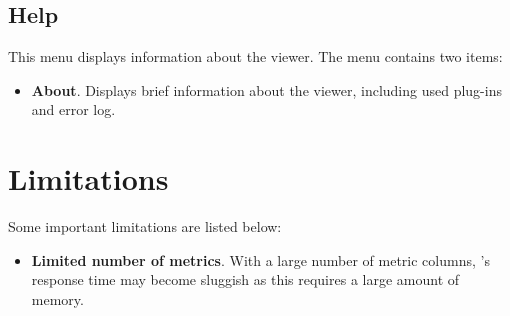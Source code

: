 
\subsection{Help}

This menu displays information about the viewer. The menu contains two items:
\begin{itemize}

\item \textbf{About}.
  Displays brief information about the viewer, including used plug-ins and error log.

\end{itemize}



\section{Limitations}

Some important \hpcviewer{} limitations are listed below:
\begin{itemize}

\item \textbf{Limited number of metrics}.
  With a large number of metric columns, \hpcviewer{}'s response time may become sluggish as this requires a large amount of memory.


\end{itemize}
